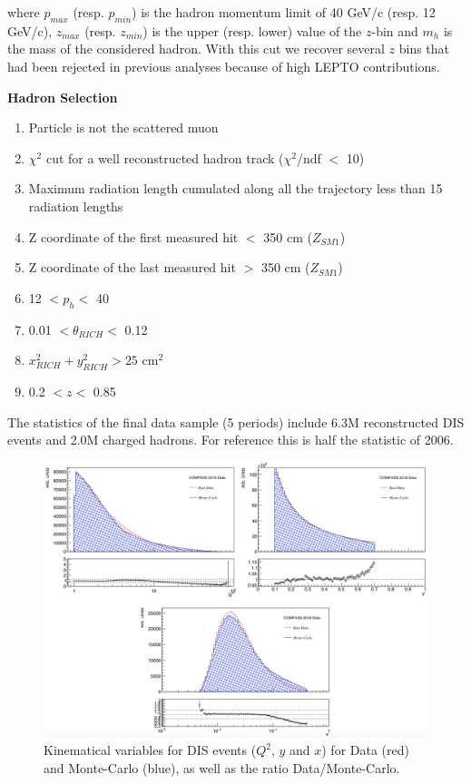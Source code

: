 \documentclass[letterpaper,12pt]{article}
\begin{document}
where $p_{max}$ (resp. $p_{min}$) is the hadron momentum limit of 40 GeV/c (resp. 12 GeV/c), $z_{max}$ (resp. $z_{min}$)
is the upper (resp. lower) value of the $z$-bin and $m_h$ is the mass of the considered hadron.
With this cut we recover several $z$ bins that had been rejected in previous analyses because of high LEPTO contributions.

\hfill
\newline

\textbf{Hadron Selection}
\begin{enumerate}
	\item Particle is not the scattered muon
	\item $\chi^2$ cut for a well reconstructed hadron track ($\chi^2$/ndf $<$ 10)
	\item Maximum radiation length cumulated along all the trajectory less than 15 radiation lengths
	\item Z coordinate of the first measured hit $<$ 350 cm ($Z_{SM1}$)
	\item Z coordinate of the last measured hit $>$ 350 cm ($Z_{SM1}$)
	\item 12 $< p_h <$ 40
	\item 0.01 $< \theta_{RICH} <$ 0.12
	\item $x^2_{RICH}+y^2_{RICH}>25$ cm$^2$
	\item 0.2 $< z <$ 0.85
\end{enumerate}

The statistics of the final data sample (5 periods) include 6.3M reconstructed DIS events and 2.0M charged hadrons.
For reference this is half the statistic of 2006.

\newpage

\hspace*{0mm}\vfill
\begin{figure}[!h]
	\includegraphics[scale=0.5]{./gfx/DIS_kin.png}
	\caption{Kinematical variables for DIS events ($Q^2$, $y$ and $x$) for Data (red) and Monte-Carlo (blue), as well as the ratio Data/Monte-Carlo.}
	\label{DISkin}
\end{figure}
\vfill\hspace*{0mm}
\end{document}
